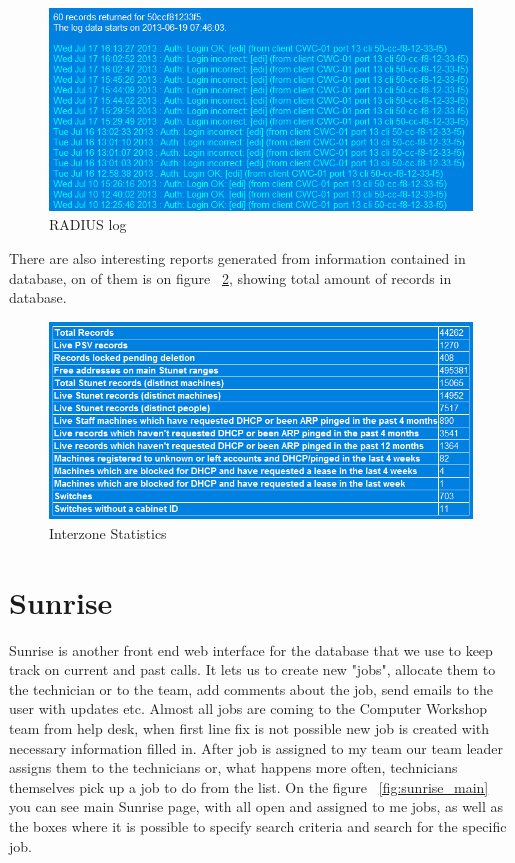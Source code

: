 \documentclass[10pt,a4paper,headinclude=true]{report}
\begin{document}
\begin{figure}[H]
\centering
\centerline{\includegraphics[scale=0.5]{./interzone_radius}}
\caption{RADIUS log}
\label{fig:interzone_radius}
\end{figure}

There are also interesting reports generated from information contained in database, on of them is on figure ~\ref{fig:interzone_statistics}, showing total amount of records in database.

\begin{figure}[H]
\centering
\centerline{\includegraphics[scale=0.5]{./interzone_statistics}}
\caption{Interzone Statistics}
\label{fig:interzone_statistics}
\end{figure}

\section{Sunrise}
Sunrise is another front end web interface for the database that we use to keep track on current and past calls. It lets us to create new "jobs", allocate them to the technician or to the team, add comments about the job, send emails to the user with updates etc. Almost all jobs are coming to the Computer Workshop team from help desk, when first line fix is not possible new job is created with necessary information filled in. After job is assigned to my team our team leader assigns them to the technicians or, what happens more often, technicians themselves pick up a job to do from the list. On the figure ~\ref{fig:sunrise_main} you can see main Sunrise page, with all open and assigned to me jobs, as well as the boxes where it is possible to specify search criteria and search for the specific job.
\end{document}
